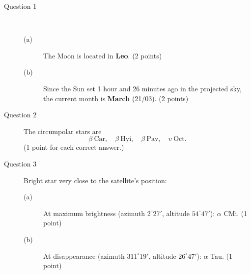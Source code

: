 \begin{description}
\item[Question 1]~
  \begin{description}
  \item[(a)] The Moon is located in \textbf{Leo}. \hfill(2 points)
  \item[(b)] Since the Sun set 1 hour and 26 minutes ago in the projected
    sky, the current month is \textbf{March} (21/03). \hfill(2 points)
  \end{description}
\item[Question 2] The circumpolar stars are
  \[
  \beta\ \mathrm{Car}, \quad \beta\ \mathrm{Hyi}, \quad
  \beta\ \mathrm{Pav}, \quad \upsilon\ \mathrm{Oct}.
  \]
  (1 point for each correct answer.)
\item[Question 3] Bright star very close to the satellite's position:
  \begin{description}
  \item[(a)] At maximum brightness (azimuth $2^\circ 27'$, altitude
    $54^\circ 47'$): $\alpha$ CMi. \hfill(1 point)
  \item[(b)] At disappearance (azimuth $311^\circ 19'$, altitude
    $26^\circ 47'$): $\alpha$ Tau. \hfill(1 point)
  \end{description}
\end{description}


